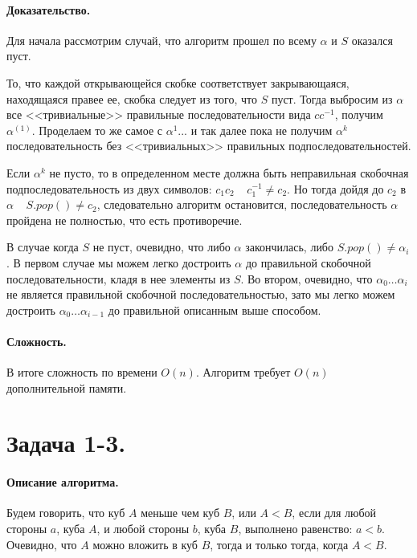 \documentclass[12pt]{article}
\begin{document}
\paragraph{Доказательство.}
Для начала рассмотрим случай, что алгоритм прошел по всему $ \alpha $ и $ S $ оказался пуст.

То, что каждой открывающейся скобке соответствует закрывающаяся, находящаяся правее ее, скобка следует
из того, что $ S $ пуст. Тогда выбросим из $ \alpha $ все <<тривиальные>> правильные последовательности вида
$cc^{-1}$, получим $ \alpha^{(1)} $. 
Проделаем то же самое с $ \alpha^{1} $... и так далее пока не получим
$ \alpha^{k} $ последовательность без <<тривиальных>> правильных подпоследовательностей. 

Если $ \alpha^{k} $ не пусто, то в определенном месте должна быть неправильная скобочная подпоследовательность из двух символов:
$ c_1c_2 \;\;\;\; c_1^{-1} \ne c_2 $. Но тогда дойдя до $ c_2 $ в $ \alpha \;\;\;\; S.pop() \ne c_2 $, следовательно
алгоритм остановится, последовательность $ \alpha $ пройдена не полностью, что есть противоречие.

В случае когда $ S $ не пуст, очевидно, что либо $ \alpha $ закончилась, либо $ S.pop() \ne \alpha_i $. В первом случае
мы можем легко достроить $ \alpha $ до правильной скобочной последовательности, кладя в нее элементы из $ S $. Во втором,
очевидно, что $ \alpha_0\dots \alpha_i $ не является правильной скобочной последовательностью, зато мы легко можем
достроить $ \alpha_0\dots \alpha_{i-1} $ до правильной описанным выше способом. 


\paragraph{Сложность.}
В итоге сложность по времени $O(n)$. Алгоритм требует $O(n)$ дополнительной памяти.




\section{Задача 1-3.} 
\paragraph{Описание алгоритма.}
Будем говорить, что куб $ A $ меньше чем куб $ B $, или $ A < B $, если для любой стороны $ a $, куба $ A $,
и любой стороны $ b $, куба $ B $, выполнено равенство: $ a < b $.
Очевидно, что $ A $ можно вложить в куб $ B $, тогда и только тогда, когда $ A < B $.
\end{document}
